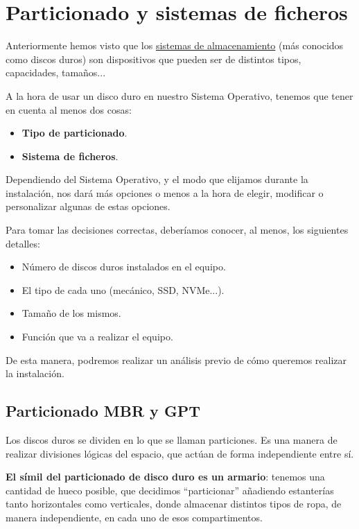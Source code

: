 \chapter{Particionado y sistemas de ficheros}
Anteriormente hemos visto que los \hyperlink{dispositivos_almacenamiento}{sistemas de almacenamiento} (más conocidos como discos duros) son dispositivos que pueden ser de distintos tipos, capacidades, tamaños...

A la hora de usar un disco duro en nuestro Sistema Operativo, tenemos que tener en cuenta al menos dos cosas:

\begin{itemize}
    \item \textbf{Tipo de particionado}.
    \item \textbf{Sistema de ficheros}.
\end{itemize}

Dependiendo del Sistema Operativo, y el modo que elijamos durante la instalación, nos dará más opciones o menos a la hora de elegir, modificar o personalizar algunas de estas opciones.

Para tomar las decisiones correctas, deberíamos conocer, al menos, los siguientes detalles:

\begin{itemize}
    \item Número de discos duros instalados en el equipo.
    \item El tipo de cada uno (mecánico, SSD, NVMe...).
    \item Tamaño de los mismos.
    \item Función que va a realizar el equipo.
\end{itemize}

De esta manera, podremos realizar un análisis previo de cómo queremos realizar la instalación.


\section{Particionado MBR y GPT }
Los discos duros se dividen en lo que se llaman particiones. Es una manera de realizar divisiones lógicas del espacio, que actúan de forma independiente entre sí.

\textbf{El símil del particionado de disco duro es un armario}: tenemos una cantidad de hueco posible, que decidimos “particionar” añadiendo estanterías tanto horizontales como verticales, donde almacenar distintos tipos de ropa, de manera independiente, en cada uno de esos compartimentos.

